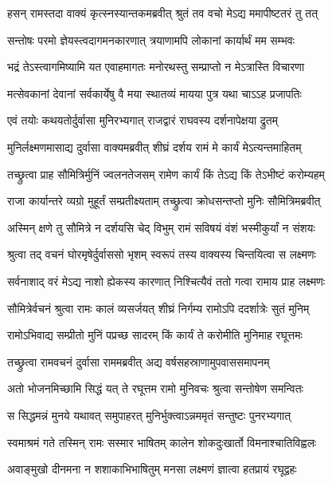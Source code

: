 \twolineshloka
{हसन् रामस्तदा वाक्यं कृत्स्नस्यान्तकमब्रवीत्}
{श्रुतं तव वचो मेऽद्य ममापीष्टतरं तु तत्} %

\twolineshloka
{सन्तोषः परमो ज्ञेयस्त्वदागमनकारणात्}
{त्रयाणामपि लोकानां कार्यार्थं मम सम्भवः} %

\twolineshloka
{भद्रं तेऽस्त्वागमिष्यामि यत एवाहमागतः}
{मनोरथस्तु सम्प्राप्तो न मेऽत्रास्ति विचारणा} %

\twolineshloka
{मत्सेवकानां देवानां सर्वकार्येषु वै मया}
{स्थातव्यं मायया पुत्र यथा चाऽऽह प्रजापतिः} %

\twolineshloka
{एवं तयोः कथयतोर्दुर्वासा मुनिरभ्यगात्}
{राजद्वारं राघवस्य दर्शनापेक्षया द्रुतम्} %

\twolineshloka
{मुनिर्लक्ष्मणमासाद्य दुर्वासा वाक्यमब्रवीत्}
{शीघ्रं दर्शय रामं मे कार्यं मेऽत्यन्तमाहितम्} %

\twolineshloka
{तच्छ्रुत्वा प्राह सौमित्रिर्मुनिं ज्वलनतेजसम्}
{रामेण कार्यं किं तेऽद्य किं तेऽभीष्टं करोम्यहम्} %

\twolineshloka
{राजा कार्यान्तरे व्यग्रो मुहूर्तं सम्प्रतीक्ष्यताम्}
{तच्छ्रुत्वा क्रोधसन्तप्तो मुनिः सौमित्रिमब्रवीत्} %

\twolineshloka
{अस्मिन् क्षणे तु सौमित्रे न दर्शयसि चेद् विभुम्}
{रामं सविषयं वंशं भस्मीकुर्यां न संशयः} %

\twolineshloka
{श्रुत्वा तद् वचनं घोरमृषेर्दुर्वाससो भृशम्}
{स्वरूपं तस्य वाक्यस्य चिन्तयित्वा स लक्ष्मणः} %

\twolineshloka
{सर्वनाशाद् वरं मेऽद्य नाशो ह्येकस्य कारणात्}
{निश्चित्यैवं ततो गत्वा रामाय प्राह लक्ष्मणः} %

\twolineshloka
{सौमित्रेर्वचनं श्रुत्वा रामः कालं व्यसर्जयत्}
{शीघ्रं निर्गम्य रामोऽपि ददर्शात्रेः सुतं मुनिम्} %

\twolineshloka
{रामोऽभिवाद्य सम्प्रीतो मुनिं पप्रच्छ सादरम्}
{किं कार्यं ते करोमीति मुनिमाह रघूत्तमः} %

\twolineshloka
{तच्छ्रुत्वा रामवचनं दुर्वासा राममब्रवीत्}
{अद्य वर्षसहस्राणामुपवाससमापनम्} %

\twolineshloka
{अतो भोजनमिच्छामि सिद्धं यत् ते रघूत्तम}
{रामो मुनिवचः श्रुत्वा सन्तोषेण समन्वितः} %

\twolineshloka
{स सिद्धमन्नं मुनये यथावत् समुपाहरत्}
{मुनिर्भुक्त्वाऽन्नममृतं सन्तुष्टः पुनरभ्यगात्} %

\twolineshloka
{स्वमाश्रमं गते तस्मिन् रामः सस्मार भाषितम्}
{कालेन शोकदुःखार्तो विमनाश्चातिविह्वलः} %

\twolineshloka
{अवाङ्मुखो दीनमना न शशाकाभिभाषितुम्}
{मनसा लक्ष्मणं ज्ञात्वा हतप्रायं रघूद्वहः} %

